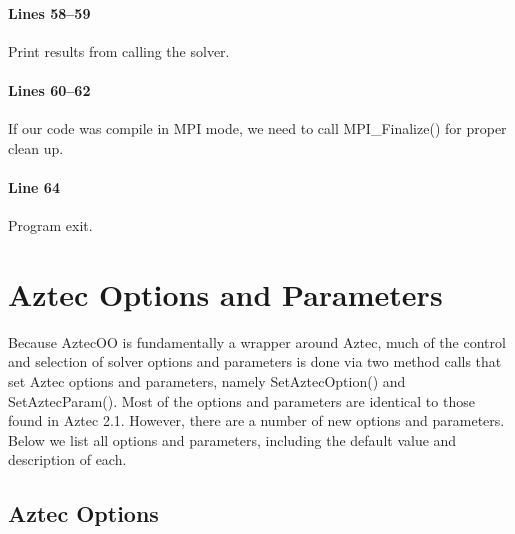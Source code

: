 \documentclass[12pt,relax]{AztecOOUserGuide}
\begin{document}
\paragraph{Lines 58--59}
Print results from calling the solver.
\paragraph{Lines 60--62}
If our code was compile in MPI mode, we need to call MPI\_Finalize()
for proper clean up.
\paragraph{Line 64} Program exit.

\section{Aztec Options and Parameters}

Because AztecOO is fundamentally a wrapper around Aztec, much of the
control and selection of solver options and parameters is done via two
method calls that set Aztec options and parameters, namely
SetAztecOption() and SetAztecParam().  Most of the
options and parameters are identical to those found in Aztec 2.1.
However, there are a number of new options and parameters.  Below we
list all options and parameters, including the default value and
description of each.

\subsection{Aztec Options\label{optionI}}
\end{document}
